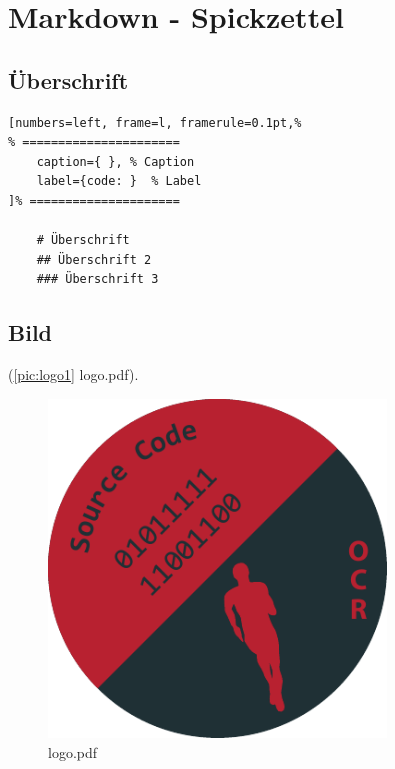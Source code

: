 
\section{Markdown - Spickzettel}\label{markdown-syntax}

\subsection{Überschrift}\label{ueberschrift}

\lstset{language=Bash} %
\begin{lstlisting}[numbers=left, frame=l, framerule=0.1pt,%
% ======================
	caption={ }, % Caption
	label={code: }  % Label
]% =====================

    # Überschrift
    ## Überschrift 2
    ### Überschrift 3
\end{lstlisting}

\subsection{Bild}\label{bild}

(\autoref{pic:logo1} logo.pdf). %

\begin{figure}[!hp]%
	\centering
	\includegraphics[width=0.8\textwidth]{img/logo.pdf}
	\caption[logo.pdf ]{logo.pdf } %
	\label{pic:logo1}	%
\end{figure}

